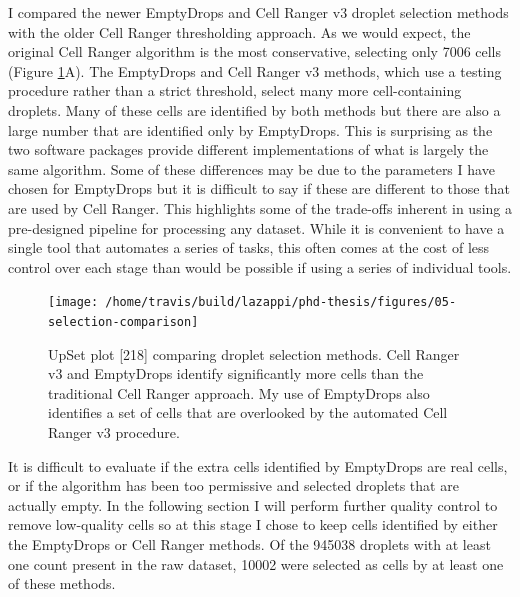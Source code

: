 \documentclass[11pt,a4paper,titlepage,twoside,openright]{style/unimelbthesis}
\theoremstyle{definition}
\theoremstyle{definition}
\theoremstyle{definition}
\theoremstyle{remark}
\begin{document}
\begin{mainmatter}
I compared the newer EmptyDrops and Cell Ranger v3 droplet selection methods with the older Cell Ranger thresholding approach. As we would expect, the original Cell Ranger algorithm is the most conservative, selecting only 7006 cells (Figure \ref{fig:selection-comparison}A). The EmptyDrops and Cell Ranger v3 methods, which use a testing procedure rather than a strict threshold, select many more cell-containing droplets. Many of these cells are identified by both methods but there are also a large number that are identified only by EmptyDrops. This is surprising as the two software packages provide different implementations of what is largely the same algorithm. Some of these differences may be due to the parameters I have chosen for EmptyDrops but it is difficult to say if these are different to those that are used by Cell Ranger. This highlights some of the trade-offs inherent in using a pre-designed pipeline for processing any dataset. While it is convenient to have a single tool that automates a series of tasks, this often comes at the cost of less control over each stage than would be possible if using a series of individual tools.

\begin{figure}

{\centering \texttt{[image: /home/travis/build/lazappi/phd-thesis/figures/05-selection-comparison]} 

}

\caption[UpSet plot comparing droplet selection methods.]{UpSet plot {[}218{]} comparing droplet selection methods. Cell Ranger v3 and EmptyDrops identify significantly more cells than the traditional Cell Ranger approach. My use of EmptyDrops also identifies a set of cells that are overlooked by the automated Cell Ranger v3 procedure.}\label{fig:selection-comparison}
\end{figure}





It is difficult to evaluate if the extra cells identified by EmptyDrops are real cells, or if the algorithm has been too permissive and selected droplets that are actually empty. In the following section I will perform further quality control to remove low-quality cells so at this stage I chose to keep cells identified by either the EmptyDrops or Cell Ranger methods. Of the 945038 droplets with at least one count present in the raw dataset, 10002 were selected as cells by at least one of these methods.

\hypertarget{alevin-comparison}{%
}
\end{mainmatter}
\end{document}
